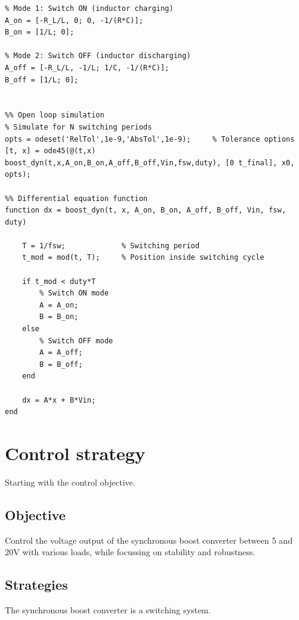\documentclass[]{article}
\begin{document}
\begin{lstlisting}[style=Matlab-editor]
%% State space model
% Mode 1: Switch ON (inductor charging)
A_on = [-R_L/L, 0; 0, -1/(R*C)];
B_on = [1/L; 0];
	
% Mode 2: Switch OFF (inductor discharging)
A_off = [-R_L/L, -1/L; 1/C, -1/(R*C)];
B_off = [1/L; 0];
	
	
%% Open loop simulation
% Simulate for N switching periods
opts = odeset('RelTol',1e-9,'AbsTol',1e-9);     % Tolerance options
[t, x] = ode45(@(t,x) boost_dyn(t,x,A_on,B_on,A_off,B_off,Vin,fsw,duty), [0 t_final], x0, opts);
	
%% Differential equation function
function dx = boost_dyn(t, x, A_on, B_on, A_off, B_off, Vin, fsw, duty)
	
	T = 1/fsw;             % Switching period
	t_mod = mod(t, T);     % Position inside switching cycle
		
	if t_mod < duty*T
		% Switch ON mode
		A = A_on;
		B = B_on;
	else
		% Switch OFF mode
		A = A_off;
		B = B_off;
	end
		
	dx = A*x + B*Vin;
end	
\end{lstlisting}

\newpage
\section{Control strategy}
Starting with the control objective.

\subsection{Objective}
Control the voltage output of the synchronous boost converter between 5 and 20V with various loads, while focussing on stability and robustness.

\subsection{Strategies}
The synchronous boost converter is a switching system. 
\end{document}
